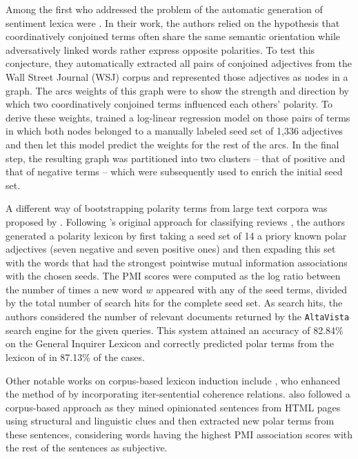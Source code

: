 Among the first who addressed the problem of the automatic generation
of sentiment lexica were \citet{Hatzivassi:97}.  In their work, the
authors relied on the hypothesis that coordinatively conjoined terms
often share the same semantic orientation while adversatively linked
words rather express opposite polarities.  To test this conjecture,
they automatically extracted all pairs of conjoined adjectives from
the Wall Street Journal (WSJ) corpus and represented those adjectives
as nodes in a graph.  The arcs weights of this graph were to show the
strength and direction by which two coordinatively conjoined terms
influenced each others' polarity.  To derive these weights,
\citeauthor{Hatzivassi:97} trained a log-linear regression model on
those pairs of terms in which both nodes belonged to a manually
labeled seed set of 1,336 adjectives and then let this model predict
the weights for the rest of the arcs.  In the final step, the
resulting graph was partitioned into two clusters -- that of positive
and that of negative terms -- which were subsequently used to enrich
the initial seed set.

A different way of bootstrapping polarity terms from large text
corpora was proposed by \citet{Turney:03}.  Following
\citeauthor{Turney:02}'s original approach for classifying reviews
\citep{Turney:02}, the authors generated a polarity lexicon by first
taking a seed set of 14 a priory known polar adjectives (seven
negative and seven positive ones) and then expading this set with the
words that had the strongest pointwise mutual information associations
with the chosen seeds.  The PMI scores were computed as the log ratio
between the number of times a new word $w$ appeared with any of the
seed terms, divided by the total number of search hits for the
complete seed set.  As search hits, the authors considered the number
of relevant documents returned by the \texttt{AltaVista} search engine
for the given queries.  This system attained an accuracy of 82.84\% on
the General Inquirer Lexicon \citep{Stone:66} and correctly predicted
polar terms from the lexicon of \cite{Hatzivassi:97} in 87.13\% of the
cases. %

Other notable works on corpus-based lexicon induction include
\citet{Kanayama:06}, who enhanced the method of
\citeauthor{Hatzivassi:97} by incorporating iter-sentential coherence
relations.  \citet{Kaji:07} also followed a corpus-based approach as
they mined opinionated sentences from HTML pages using structural and
linguistic clues and then extracted new polar terms from these
sentences, considering words having the highest PMI association scores
with the rest of the sentences as subjective.


